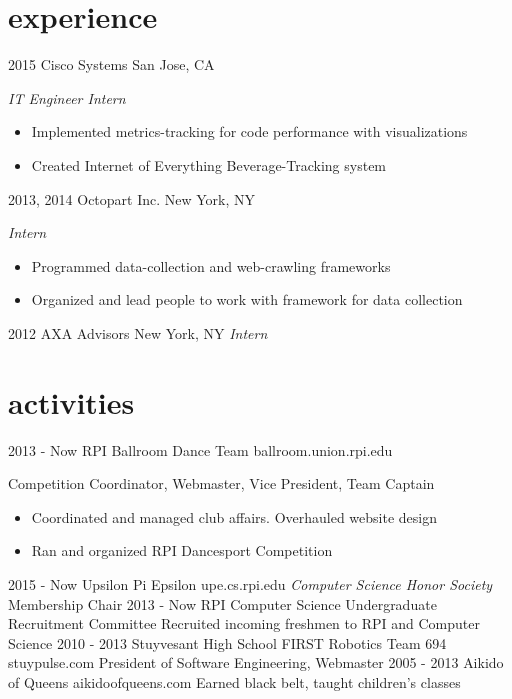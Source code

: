 \documentclass[]{friggeri-cv}
\begin{document}
\section{experience}

\begin{entrylist}
  \entry
    {2015}
    {Cisco Systems}
    {San Jose, CA}
    {\emph{IT Engineer Intern}
    \begin{itemize}
        \item Implemented metrics-tracking for code performance with visualizations
        \item Created Internet of Everything Beverage-Tracking system
    \end{itemize}
    }
  \entry
    {2013, 2014}
    {Octopart Inc.}
    {New York, NY}
    {\emph{Intern}
    \begin{itemize}
        \item Programmed data-collection and web-crawling frameworks
        \item Organized and lead people to work with framework for data collection
    \end{itemize}
    }
  \entry
    {2012}
    {AXA Advisors}
    {New York, NY}
    {\emph{Intern}}
\end{entrylist}

\section{activities}

\begin{entrylist}
  \entry
    {2013 - Now}
    {RPI Ballroom Dance Team}
    {ballroom.union.rpi.edu}
    {Competition Coordinator, Webmaster, Vice President, Team Captain
    \begin{itemize}
        \item Coordinated and managed club affairs. Overhauled website design
        \item Ran and organized RPI Dancesport Competition
    \end{itemize}
    }
  \entry
    {2015 - Now}
    {Upsilon Pi Epsilon}
    {upe.cs.rpi.edu}
    {\emph{Computer Science Honor Society}\\
    Membership Chair}
  \entry
    {2013 - Now}
    {RPI Computer Science Undergraduate Recruitment Committee}
    {}
    {Recruited incoming freshmen to RPI and Computer Science}
  \entry
    {2010 - 2013}
    {Stuyvesant High School FIRST Robotics Team 694}
    {stuypulse.com}
    {President of Software Engineering, Webmaster}
  \entry
    {2005 - 2013}
    {Aikido of Queens}
    {aikidoofqueens.com}
    {Earned black belt, taught children's classes}
\end{entrylist}
\end{document}
